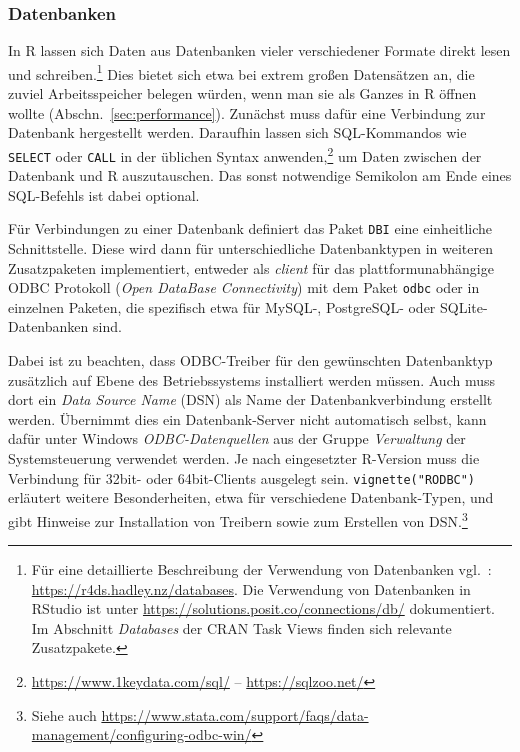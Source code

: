 \subsubsection{Datenbanken}

In R lassen sich Daten aus Datenbanken vieler verschiedener Formate direkt lesen und schreiben.\footnote{Für eine detaillierte Beschreibung der Verwendung von Datenbanken vgl.\ : \url{https://r4ds.hadley.nz/databases}. Die Verwendung von Datenbanken in RStudio ist unter \url{https://solutions.posit.co/connections/db/} dokumentiert. Im Abschnitt \emph{Databases} der CRAN Task Views \cite{CRANtvDatabase} finden sich relevante Zusatzpakete.} Dies bietet sich etwa bei extrem großen Datensätzen an, die zuviel Arbeitsspeicher belegen würden, wenn man sie als Ganzes in R öffnen wollte (Abschn.\ \ref{sec:performance}). Zunächst muss dafür eine Verbindung zur Datenbank hergestellt werden. Daraufhin lassen sich SQL-Kommandos wie \lstinline!SELECT! oder \lstinline!CALL! in der üblichen Syntax anwenden,\footnote{\url{https://www.1keydata.com/sql/} -- \url{https://sqlzoo.net/}} um Daten zwischen der Datenbank und R auszutauschen. Das sonst notwendige Semikolon am Ende eines SQL-Befehls ist dabei optional.

Für Verbindungen zu einer Datenbank definiert das Paket \lstinline!DBI! \cite{RSIGDB2014} eine einheitliche Schnittstelle. Diese wird dann für unterschiedliche Datenbanktypen in weiteren Zusatzpaketen implementiert, entweder als \emph{client} für das plattformunabhängige ODBC Protokoll (\emph{Open DataBase Connectivity}) mit dem Paket \lstinline!odbc! \cite{Hester2018} oder in einzelnen Paketen, die spezifisch etwa für MySQL-, PostgreSQL- oder SQLite-Datenbanken sind.

Dabei ist zu beachten, dass ODBC-Treiber für den gewünschten Datenbanktyp zusätzlich auf Ebene des Betriebssystems installiert werden müssen. Auch muss dort ein \emph{Data Source Name} (DSN) als Name der Datenbankverbindung erstellt werden. Übernimmt dies ein Datenbank-Server nicht automatisch selbst, kann dafür unter Windows \emph{ODBC-Datenquellen} aus der Gruppe \emph{Verwaltung} der Systemsteuerung verwendet werden. Je nach eingesetzter R-Version muss die Verbindung für 32bit- oder 64bit-Clients ausgelegt sein. \lstinline!vignette("RODBC")! erläutert weitere Besonderheiten, etwa für verschiedene Datenbank-Typen, und gibt Hinweise zur Installation von Treibern sowie zum Erstellen von DSN.\footnote{Siehe auch \url{https://www.stata.com/support/faqs/data-management/configuring-odbc-win/}}

